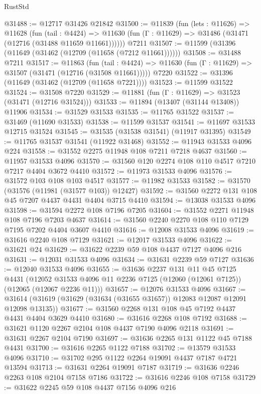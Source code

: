 \begin{lexlean}{RustStd}
\begin{coremodule}
@31488 := @12717 @31426 @21842
@31500 := @11839
    (fun (lets : @11626) =>
    @11628
      (fun (tail : @4424) =>
      @11630 (fun (Γ : @11629) => @31486 (@31471 (@12716 (@31488 @11659 @11661))))))
    @7211
@31507 := @11599 (@31396 (@11649 (@31462 (@12709 (@11658 (@7212 @11661))))))
@31508 := @31488 @7211
@31517 := @11863
    (fun (tail : @4424) => @11630 (fun (Γ : @11629) => @31507 (@31471 (@12716 (@31508 @11661)))))
    @7220
@31522 := @31396 (@11649 (@31462 (@12709 (@11658 @7221))))
@31523 := @11599 @31522
@31524 := @31508 @7220
@31529 := @11881 (fun (Γ : @11629) => @31523 (@31471 (@12716 @31524)))
@31533 := @11894 (@13407 (@31144 @13408)) @11906
@31534 := @31529 @31533
@31535 := @11765 @31522
@31537 := @31469 (@11690 @31533)
@31538 := @11599 @31537
@31541 := @11697 @31533 @12715 @31524
@31545 := @31535 (@31538 @31541) (@11917 @31395)
@31549 := @11765 @31537 @31541 (@11922 @31468)
@31552 := @11943 @31533 @4096 @224
@31558 := @31552 @2275 @11948 @108 @7211 @7218 @4637
@31560 := @11957 @31533 @4096
@31570 := @31560 @120 @2274 @108 @110 @4517 @7210 @7217 @4404 @3672 @4410
@31572 := @11973 @31533 @4096
@31576 := @31572 @103 @108 @103 @4517
@31577 := @11982 @31533
@31582 := @31570 (@31576 (@11981 (@31577 @103)) @12427)
@31592 := @31560 @2272 @131 @108 @45 @7207 @4437 @4431 @4404 @3715 @4410
@31594 := @13038 @31533 @4096
@31598 := @31594 @2272 @108 @7196 @7205
@31604 := @31552 @2271 @11948 @108 @7196 @7203 @4637
@31614 := @31560 @2240 @2270 @108 @110 @7129 @7195 @7202 @4404 @3607 @4410
@31616 := @12008 @31533 @4096
@31619 := @31616 @2240 @108 @7129
@31621 := @12017 @31533 @4096
@31622 := @31621 @24
@31629 := @31622 @2239 @59 @108 @4437 @7127 @4096 @216
@31631 := @12031 @31533 @4096
@31634 := @31631 @2239 @59 @7127
@31636 := @12040 @31533 @4096
@31655 := @31636
    @2237
    @131
    @11
    @45
    @7125
    @4431
    (@12052 @31533 @4096 @11 @2236 @7125 (@12060 (@12061 @7125)) (@12065 (@12067 @2236 @11)))
@31657 := @12076 @31533 @4096
@31667 := @31614 (@31619 (@31629 (@31634 (@31655 @31657)) @12083 @12087 @12091 @12098 @13135))
@31677 := @31560 @2268 @131 @108 @45 @7192 @4437 @4431 @4404 @3629 @4410
@31680 := @31616 @2268 @108 @7192
@31688 := @31621 @1120 @2267 @2104 @108 @4437 @7190 @4096 @2118
@31691 := @31631 @2267 @2104 @7190
@31697 := @31636 @2265 @131 @1122 @45 @7188 @4431
@31700 := @31616 @2265 @1122 @7188
@31702 := @13579 @31533 @4096
@31710 := @31702 @295 @1122 @2264 @19091 @4437 @7187 @4721 @13594
@31713 := @31631 @2264 @19091 @7187
@31719 := @31636 @2246 @2263 @108 @2104 @7158 @7186
@31722 := @31616 @2246 @108 @7158
@31729 := @31622 @2245 @59 @108 @4437 @7156 @4096 @216

\end{coremodule}
\end{lexlean}
